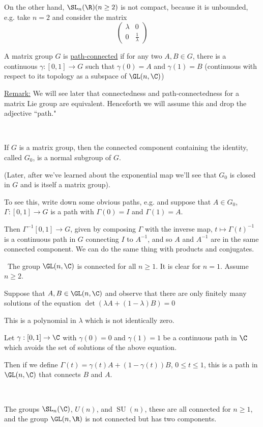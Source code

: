 \documentclass[x11names,reqno,14pt]{extarticle}
\newcommand{\pmat}[4]{\begin{pmatrix} #1 & #2 \\ #3 & #4 \end{pmatrix}}
\DeclareMathOperator{\SU}{SU}
\begin{document}
On the other hand, $\SL_n(\R) (n\geq2)$ is not compact, because it is unbounded, e.g. take $n = 2$ and consider the matrix 
\[
\pmat{\lambda}{0}{0}{\frac{1}{\lambda}}
\]


A matrix group $G$ is \underline{path-connected} if for any two $A, B \in G$, there is a continuous $\gamma:[0,1]\to G$ such that $\gamma(0) = A$ and $\gamma(1) = B$ (continuous with respect to its topology as a subspace of $\GL(n,\C)$)

\underline{Remark:} We will see later that connectedness and path-connectedness for a matrix Lie group are equivalent. Henceforth we will assume this and drop the adjective ``path."

\exm
\,

If $G$ is a matrix group, then the connected component containing the identity, called $G_0$, is a normal subgroup of $G$. 

(Later, after we've learned about the exponential map we'll see that $G_0$ is closed in $G$ and is itself a matrix group).

To see this, write down some obvious paths, e.g. and suppose that $A \in G_0$, $\Gamma:[0,1]\to G$ is a path with $\Gamma(0) = I$ and $\Gamma(1) = A$. 

Then $\Gamma^{-1}[0,1]\to G$, given by composing $\Gamma$ with the inverse map, $t \mapsto \Gamma(t)^{-1}$ is a continuous path in $G$ connecting $I$ to $A^{-1}$, and so $A$ and $A^{-1}$ are in the same connected component. We can do the same thing with products and conjugates. 

\exm
\,
The group $\GL(n,\C)$ is connected for all $n \geq 1$. It is clear for $n = 1$. Assume $n \geq 2$. 

Suppose that $A, B \in \GL(n,\C)$ and observe that there are only finitely many solutions of the equation $\det(\lambda A + (1-\lambda)B) = 0$

This is a polynomial in $\lambda$ which is not identically zero. 

Let $\gamma:[0,1]\to \C$ with $\gamma(0) = 0$ and $\gamma(1) = 1$ be a continuous path in $\C$ which avoids the set of solutions of the above equation.

Then if we define $\Gamma(t) = \gamma(t)A + (1 - \gamma(t))B$, $0 \leq t \leq 1$, this is a path in $\GL(n,\C)$ that connects $B$ and $A$.

\exm
\,

The groups $\SL_n(\C)$, $U(n)$, and $\SU(n)$, these are all connected for $n \geq 1$, and the group $\GL(n,\R)$ is not connected but has two components. 
\end{document}
